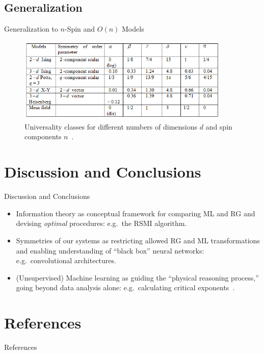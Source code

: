 \documentclass{beamer}
\begin{document}
\subsection{Generalization}
\begin{frame}{Generalization to $n$-Spin and $O(n)$ Models}
  \begin{figure}[ht]
    \centering
    \includegraphics[width=0.9\textwidth]{figures/universality-classes.png}
    \caption{Universality classes for different numbers of dimensions
      $d$ and spin components $n$~\cite{universality-classes}.}
  \end{figure}
\end{frame}

\section{Discussion and Conclusions}
\begin{frame}{Discussion and Conclusions}
  \begin{itemize}
  \item Information theory as conceptual framework for comparing ML
    and RG and devising \textit{optimal} procedures: e.g.\ the RSMI
    algorithm.
  \item Symmetries of our systems as restricting allowed RG and ML
    transformations and enabling understanding of ``black box'' neural
    networks: e.g.\ convolutional architectures.
  \item (Unsupervised) Machine learning as guiding the ``physical reasoning
    process,'' going beyond data analysis alone: e.g.\ calculating
    critical exponents~\cite{kjr}.
  \end{itemize}
\end{frame}


\section{References}
\begin{frame}{References}
  {\tiny

     
  }
\end{frame}
\end{document}
